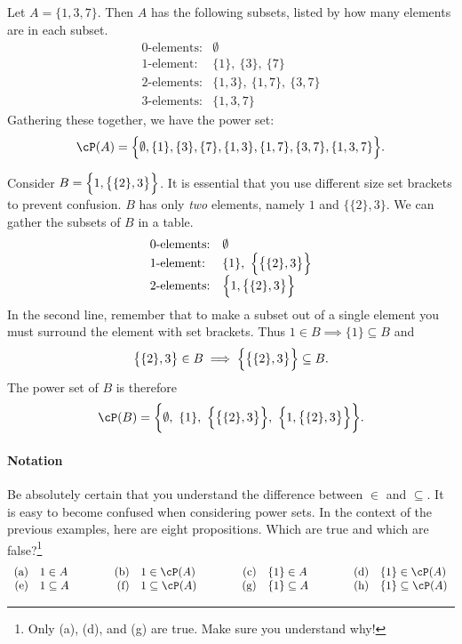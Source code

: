 \begin{examples}
	\item Let $A=\{1,3,7\}$. Then $A$ has the following subsets, listed by how many elements are in each subset.
\[\begin{array}{ll}
\text{0-elements:}&\emptyset\\
\text{1-element:}&\{1\},\ \{3\},\ \{7\}\\
\text{2-elements:}&\{1,3\},\ \{1,7\},\ \{3,7\}\\
\text{3-elements:}&\{1,3,7\}
\end{array}\]
Gathering these together, we have the power set:
\[\cP(A)=\Bigl\{\emptyset,\{1\},\{3\},\{7\},\{1,3\},\{1,7\},\{3,7\},\{1,3,7\}\Bigr\}.\]
\item Consider $B=\Bigl\{1,\bigl\{\{2\},3\bigr\}\Bigr\}$. It is essential that you use different size set brackets to prevent confusion. $B$ has only \emph{two} elements, namely $1$ and $\bigl\{\{2\},3\bigr\}$. We can gather the subsets of $B$ in a table.
\[\begin{array}{ll}
\text{0-elements:}&\emptyset\\
\text{1-element:}&\{1\},\ \Bigl\{\bigl\{\{2\},3\bigr\}\Bigr\}\\
\text{2-elements:}&\Bigl\{1,\bigl\{\{2\},3\bigr\}\Bigr\}
\end{array}\]
In the second line, remember that to make a subset out of a single element you must surround the element with set brackets. Thus $1\in B\implies \{1\}\subseteq B$ and
\[\bigl\{\{2\},3\bigr\}\in B\implies \Bigl\{\bigl\{\{2\},3\bigr\}\Bigr\}\subseteq B.\]
The power set of $B$ is therefore
\[\cP(B)=\biggl\{\emptyset,\ \{1\},\ \Bigl\{\bigl\{\{2\},3\bigr\}\Bigr\},\ \Bigl\{1,\bigl\{\{2\},3\bigr\}\Bigr\}\biggr\}.\]
\end{examples}\pagebreak[2]


\paragraph{Notation}

Be absolutely certain that you understand the difference between $\in$ and $\subseteq$. It is easy to become confused when considering power sets. In the context of the previous examples, here are eight propositions. Which are true and which are false?\footnote{Only (a), (d), and (g) are true. Make sure you understand why!}
\[\begin{array}{r@{\quad}l@{\qquad\qquad}r@{\quad}l@{\qquad\qquad}r@{\quad}l@{\qquad\qquad}r@{\quad}l}
\text{(a)}&1\in A
		&\text{(b)}&1\in\cP(A)
		&\text{(c)}&\{1\}\in A
		&\text{(d)}&\{1\}\in\cP(A)\\
\text{(e)}&1\subseteq A
		&\text{(f)}&1\subseteq\cP(A)
		&\text{(g)}&\{1\}\subseteq A
		&\text{(h)}&\{1\}\subseteq\cP(A)
\end{array}\]

